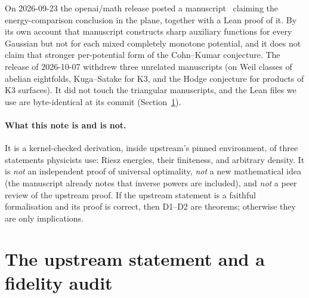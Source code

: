 \documentclass[11pt]{article}
\begin{document}
On 2026-09-23 the openai/math release posted a manuscript~\cite{oai} claiming the energy-comparison conclusion in the plane, together with a
Lean proof of it. By its own account that manuscript constructs sharp auxiliary functions for every Gaussian but not for each mixed completely monotone
potential, and it does not claim that stronger per-potential form of the Cohn--Kumar conjecture. The release of 2026-10-07 withdrew three unrelated manuscripts (on Weil classes of abelian eightfolds, Kuga--Satake for K3, and the Hodge conjecture for
products of K3 surfaces). It did not touch
the triangular manuscripts, and the Lean files we use are byte-identical at its commit (Section~\ref{sec:fidelity}).

\paragraph{What this note is and is not.} It is a kernel-checked derivation, inside upstream's pinned environment, of three statements
physicists use: Riesz energies, their finiteness, and arbitrary density. It is \emph{not} an independent proof of universal optimality,
\emph{not} a new mathematical idea (the manuscript already notes that inverse powers are included), and \emph{not} a peer review of
the upstream proof. If the upstream statement is a faithful formalisation and its proof is correct, then D1--D2 are theorems; otherwise they
are only implications.

\section{The upstream statement and a fidelity audit}\label{sec:fidelity}
\end{document}
